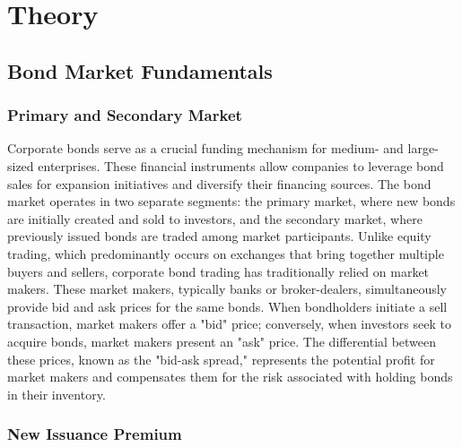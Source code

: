 \chapter{Theory}
\label{ch:theory}

\section{Bond Market Fundamentals}

\subsection{Primary and Secondary Market}

Corporate bonds serve as a crucial funding mechanism for medium- and large-sized enterprises. These financial instruments allow companies to leverage bond sales for expansion initiatives and diversify their financing sources. The bond market operates in two separate segments: the primary market, where new bonds are initially created and sold to investors, and the secondary market, where previously issued bonds are traded among market participants. Unlike equity trading, which predominantly occurs on exchanges that bring together multiple buyers and sellers, corporate bond trading has traditionally relied on market makers. These market makers, typically banks or broker-dealers, simultaneously provide bid and ask prices for the same bonds. When bondholders initiate a sell transaction, market makers offer a "bid" price; conversely, when investors seek to acquire bonds, market makers present an "ask" price. The differential between these prices, known as the "bid-ask spread," represents the potential profit for market makers and compensates them for the risk associated with holding bonds in their inventory.

\subsection{New Issuance Premium}

